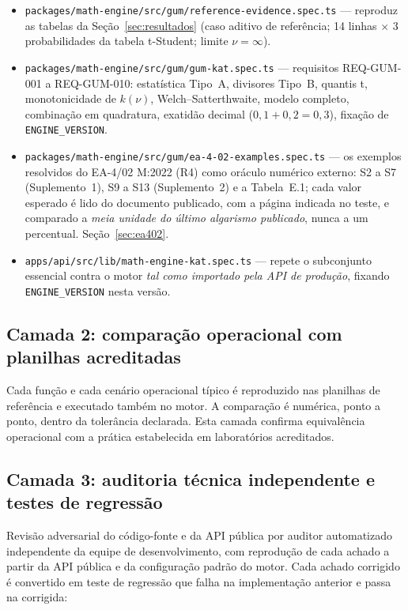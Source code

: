 \documentclass[11pt,a4paper]{article}
\begin{document}
\begin{itemize}
  \item \texttt{packages/math-engine/src/gum/reference-evidence.spec.ts} --- reproduz as tabelas da Seção~\ref{sec:resultados} (caso aditivo de referência; 14 linhas \(\times\) 3 probabilidades da tabela t-Student; limite \(\nu = \infty\)).
  \item \texttt{packages/math-engine/src/gum/gum-kat.spec.ts} --- requisitos REQ-GUM-001 a REQ-GUM-010: estatística Tipo~A, divisores Tipo~B, quantis t, monotonicidade de \(k(\nu)\), Welch--Satterthwaite, modelo completo, combinação em quadratura, exatidão decimal (\(0{,}1 + 0{,}2 = 0{,}3\)), fixação de \texttt{ENGINE\_VERSION}.
  \item \texttt{packages/math-engine/src/gum/ea-4-02-examples.spec.ts} --- os exemplos resolvidos do EA-4/02 M:2022 (R4) como oráculo numérico externo: S2 a S7 (Suplemento~1), S9 a S13 (Suplemento~2) e a Tabela~E.1; cada valor esperado é lido do documento publicado, com a página indicada no teste, e comparado a \emph{meia unidade do último algarismo publicado}, nunca a um percentual. Seção~\ref{sec:ea402}.
  \item \texttt{apps/api/src/lib/math-engine-kat.spec.ts} --- repete o subconjunto essencial contra o motor \emph{tal como importado pela API de produção}, fixando \texttt{ENGINE\_VERSION} nesta versão.
\end{itemize}

\subsection{Camada 2: comparação operacional com planilhas acreditadas}

Cada função e cada cenário operacional típico é reproduzido nas planilhas de referência e executado também no motor. A comparação é numérica, ponto a ponto, dentro da tolerância declarada. Esta camada confirma equivalência operacional com a prática estabelecida em laboratórios acreditados.

\subsection{Camada 3: auditoria técnica independente e testes de regressão}

Revisão adversarial do código-fonte e da API pública por auditor automatizado independente da equipe de desenvolvimento, com reprodução de cada achado a partir da API pública e da configuração padrão do motor. Cada achado corrigido é convertido em teste de regressão que falha na implementação anterior e passa na corrigida:
\end{document}
